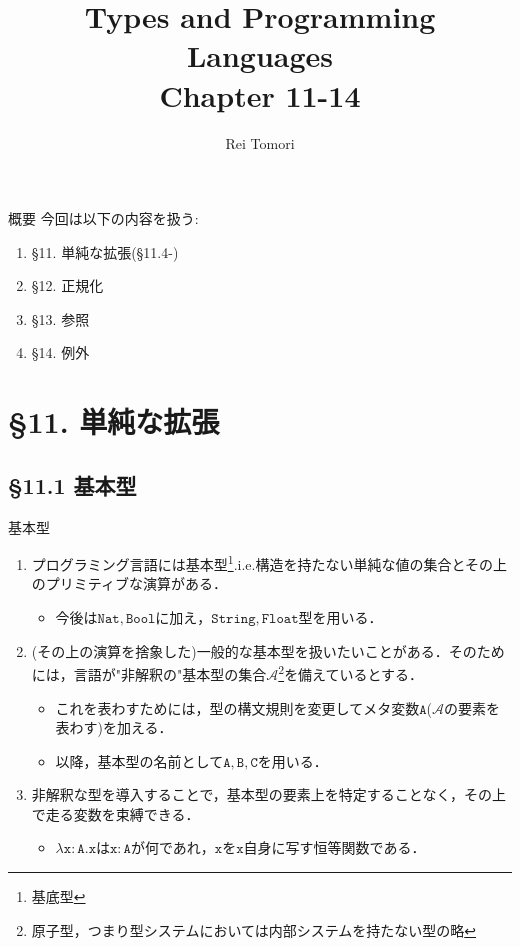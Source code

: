 \documentclass[9pt]{beamer}
\title{Types and Programming Languages\\ Chapter 11-14}
\author{Rei Tomori}
\begin{document}
\maketitle
\begin{frame}{概要}
	今回は以下の内容を扱う: \begin{enumerate}
        \item \S 11. 単純な拡張(\S11.4-)
        \item \S 12. 正規化
        \item \S 13. 参照
        \item \S14. 例外
    \end{enumerate}
\end{frame}
\section{\S11. 単純な拡張}
\subsection{\S11.1 基本型}
\begin{frame}{基本型}
    \begin{enumerate}
    \item プログラミング言語には基本型\footnote{基底型}.i.e.構造を持たない単純な値の集合とその上のプリミティブな演算がある．\begin{itemize}
    \item 今後は$\mathtt{Nat, Bool}$に加え，$\mathtt{String, Float}$型を用いる．
    \end{itemize}
    \item (その上の演算を捨象した)一般的な基本型を扱いたいことがある．そのためには，言語が"非解釈の"基本型の集合$\mathscr{A}$\footnote{原子型，つまり型システムにおいては内部システムを持たない型の略}を備えているとする．\begin{itemize}
    \item これを表わすためには，型の構文規則を変更してメタ変数$\mathtt{A}$($\mathscr{A}$の要素を表わす)を加える．
    \item 以降，基本型の名前として$\mathtt{A, B, C}$を用いる．
    \end{itemize}
    \item 非解釈な型を導入することで，基本型の要素上を特定することなく，その上で走る変数を束縛できる．\begin{itemize}
    \item $\mathtt{\lambda x:A. x}$は$\mathtt{x:A}$が何であれ，$\mathtt{x}$を$\mathtt{x}$自身に写す恒等関数である．
    \end{itemize}
    \end{enumerate}
\end{frame}
\end{document}

